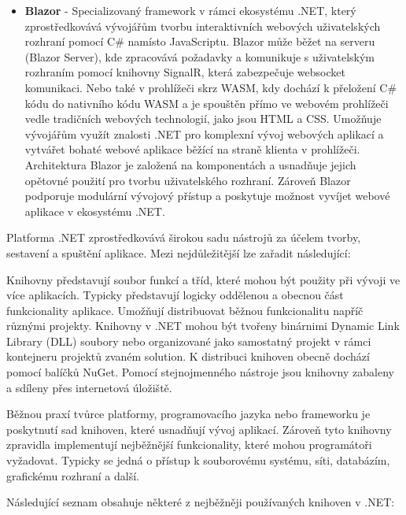 \begin{itemize}
    \item \textbf{Blazor} - Specializovaný framework v rámci ekosystému .NET, který zprostředkovává vývojářům tvorbu interaktivních webových uživatelských rozhraní pomocí C\# namísto JavaScriptu. Blazor může běžet na serveru (Blazor Server), kde zpracovává požadavky a komunikuje s uživatelským rozhraním pomocí knihovny SignalR, která zabezpečuje websocket komunikaci. Nebo také v prohlížeči skrz WASM, kdy dochází k přeložení C\# kódu do nativního kódu WASM a je spouštěn přímo ve webovém prohlížeči vedle tradičních webových technologií, jako jsou HTML a CSS. \cite{Price2023c8} Umožňuje vývojářům využít znalosti .NET pro komplexní vývoj webových aplikací a vytvářet bohaté webové aplikace běžící na straně klienta v prohlížeči. Architektura Blazor je založená na komponentách a usnadňuje jejich opětovné použití pro tvorbu uživatelského rozhraní. Zároveň Blazor podporuje modulární vývojový přístup a poskytuje možnost vyvíjet webové aplikace v ekosystému .NET.
\end{itemize}


Platforma .NET zprostředkovává širokou sadu nástrojů za účelem tvorby, sestavení a spuštění aplikace. Mezi nejdůležitější lze zařadit následující:


Knihovny představují soubor funkcí a tříd, které mohou být použity při vývoji ve více aplikacích. Typicky představují logicky oddělenou a obecnou část funkcionality aplikace. Umožňují distribuovat běžnou funkcionalitu napříč různými projekty. \cite{Price2023c8}  Knihovny v .NET mohou být tvořeny binárnimi Dynamic Link Library (DLL) soubory nebo organizované jako samostatný projekt v rámci kontejneru projektů zvaném solution. K distribuci knihoven obecně dochází pomocí balíčků NuGet. Pomocí stejnojmenného nástroje jsou knihovny zabaleny a sdíleny přes internetová úložiště. 

Běžnou praxí tvůrce platformy, programovacího jazyka nebo frameworku je poskytnutí sad knihoven, které usnadňují vývoj aplikací. Zároveň tyto knihovny zpravidla implementují nejběžnější funkcionality, které mohou programátoři vyžadovat. Typicky se jedná o přístup k souborovému systému, síti, databázím, grafickému rozhraní a další.

Následující seznam obsahuje některé z nejběžněji používaných knihoven v .NET:

